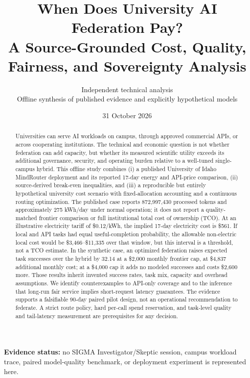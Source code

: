 \title{When Does University AI Federation Pay?\\\large A Source-Grounded Cost, Quality, Fairness, and Sovereignty Analysis}
\author{Independent technical analysis\\\small Offline synthesis of published evidence and explicitly hypothetical models}
\date{31 October 2026}
\maketitle
\begin{center}\small\textbf{Evidence status:} no SIGMA Investigator/Skeptic session, campus workload trace, paired model-quality benchmark, or deployment experiment is represented here.\end{center}

\begin{abstract}
Universities can serve AI workloads on campus, through approved commercial APIs, or across cooperating institutions. The technical and economic question is not whether federation can add capacity, but whether its measured scientific utility exceeds its additional governance, security, and operating burden relative to a well-tuned single-campus hybrid. This offline study combines (i) a published University of Idaho MindRouter deployment and its reported 17-day energy and API-price comparison, (ii) source-derived break-even inequalities, and (iii) a reproducible but entirely hypothetical university cost scenario with fixed-allocation accounting and a continuous routing optimization. The published case reports 872,997,430 processed tokens and approximately 275 kWh/day under normal operation; it does not report a quality-matched frontier comparison or full institutional total cost of ownership (TCO). At an illustrative electricity tariff of \$0.12/kWh, the implied 17-day electricity cost is \$561. If local and API tasks had equal useful-completion probability, the allowable non-electric local cost would be \$3,466--\$11,335 over that window, but this interval is a threshold, not a TCO estimate. In the synthetic case, an optimized federation raises expected task successes over the hybrid by 32.14 at a \$2,000 monthly frontier cap, at \$4,837 additional monthly cost; at a \$4,000 cap it adds no modeled successes and costs \$2,600 more. Those results inherit invented success rates, task mix, capacity and overhead assumptions. We identify counterexamples to API-only coverage and to the inference that long-run fair service implies short-request latency guarantees. The evidence supports a falsifiable 90-day paired pilot design, not an operational recommendation to federate. A strict route policy, hard per-call spend reservation, and task-level quality and tail-latency measurement are prerequisites for any decision.
\end{abstract}

